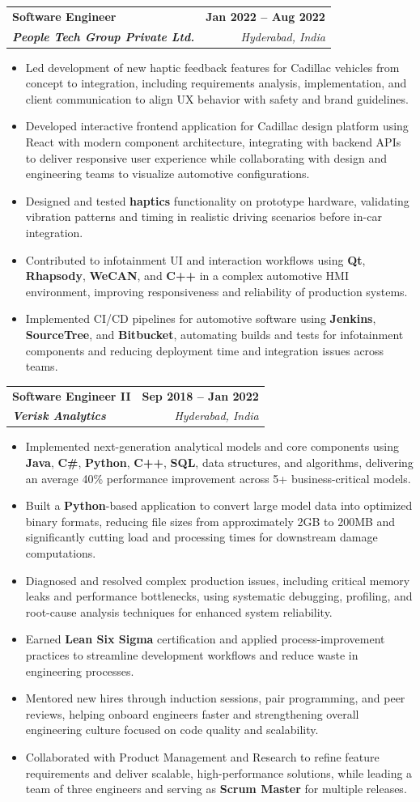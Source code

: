 \documentclass[letterpaper,11pt]{article}
\makeatletter
\newcommand{\resumeItem}[1]{
  \item\small{
    {#1 \vspace{-2pt}}
  }
}
\newcommand{\resumeSubheading}[4]{
  \vspace{-2pt}\item
    \begin{tabular*}{1.0\textwidth}[t]{l@{\extracolsep{\fill}}r}
      \textbf{#1} & \textbf{\small #2} \\
      \textit{\small#3} & \textit{\small #4} \\
    \end{tabular*}\vspace{-7pt}
}
\newcommand{\resumeItemListStart}{\begin{itemize}}
\newcommand{\resumeItemListEnd}{\end{itemize}\vspace{-5pt}}
\makeatother
\begin{document}
    \resumeSubheading
      {\textbf{Software Engineer}}{\textbf{Jan 2022 -- Aug 2022}}
      {\textbf{People Tech Group Private Ltd.}}{Hyderabad, India}
      \resumeItemListStart
        \resumeItem{Led development of new haptic feedback features for Cadillac vehicles from concept to integration, including requirements analysis, implementation, and client communication to align UX behavior with safety and brand guidelines.}
        \resumeItem{Developed interactive frontend application for Cadillac design platform using React with modern component architecture, integrating with backend APIs to deliver responsive user experience while collaborating with design and engineering teams to visualize automotive configurations.}
        \resumeItem{Designed and tested \textbf{haptics} functionality on prototype hardware, validating vibration patterns and timing in realistic driving scenarios before in-car integration.}
        \resumeItem{Contributed to infotainment UI and interaction workflows using \textbf{Qt}, \textbf{Rhapsody}, \textbf{WeCAN}, and \textbf{C++} in a complex automotive HMI environment, improving responsiveness and reliability of production systems.}
        \resumeItem{Implemented CI/CD pipelines for automotive software using \textbf{Jenkins}, \textbf{SourceTree}, and \textbf{Bitbucket}, automating builds and tests for infotainment components and reducing deployment time and integration issues across teams.}
      \resumeItemListEnd

    \resumeSubheading
      {\textbf{Software Engineer II}}{\textbf{Sep 2018 -- Jan 2022}}
      {\textbf{Verisk Analytics}}{Hyderabad, India}
      \resumeItemListStart
        \resumeItem{Implemented next-generation analytical models and core components using \textbf{Java}, \textbf{C\#}, \textbf{Python}, \textbf{C++}, \textbf{SQL}, data structures, and algorithms, delivering an average 40\% performance improvement across 5+ business-critical models.}
        \resumeItem{Built a \textbf{Python}-based application to convert large model data into optimized binary formats, reducing file sizes from approximately 2GB to 200MB and significantly cutting load and processing times for downstream damage computations.}
        \resumeItem{Diagnosed and resolved complex production issues, including critical memory leaks and performance bottlenecks, using systematic debugging, profiling, and root-cause analysis techniques for enhanced system reliability.}
        \resumeItem{Earned \textbf{Lean Six Sigma} certification and applied process-improvement practices to streamline development workflows and reduce waste in engineering processes.}
        \resumeItem{Mentored new hires through induction sessions, pair programming, and peer reviews, helping onboard engineers faster and strengthening overall engineering culture focused on code quality and scalability.}
        \resumeItem{Collaborated with Product Management and Research to refine feature requirements and deliver scalable, high-performance solutions, while leading a team of three engineers and serving as \textbf{Scrum Master} for multiple releases.}
      \resumeItemListEnd
\end{document}
